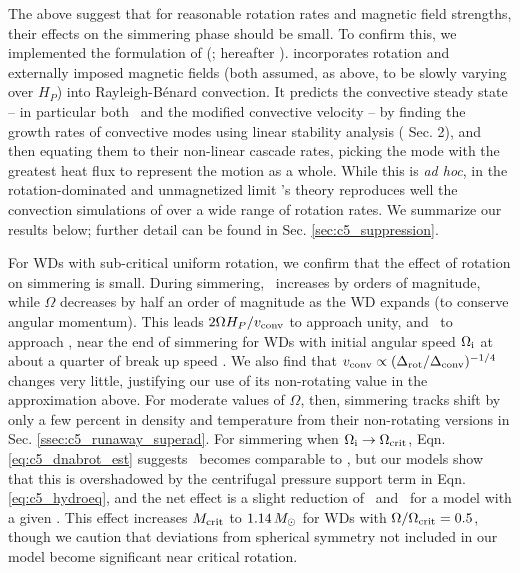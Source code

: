 The above suggest that for reasonable rotation rates and magnetic field strengths, their effects on the simmering phase should be small.  To confirm this, we implemented the formulation of \citeauthor{stev79} (\citeyear{stev79}; hereafter \citeal{stev79}).  \citeal{stev79} incorporates rotation and externally imposed magnetic fields (both assumed, as above, to be slowly varying over $H_P$) into Rayleigh-B\'{e}nard convection.  It predicts the convective steady state -- in particular both \deltanab\ and the modified convective velocity -- by finding the growth rates of convective modes using linear stability analysis (\citeal{stev79} Sec. 2), and then equating them to their non-linear cascade rates, picking the mode with the greatest heat flux to represent the motion as a whole.  While this is \textit{ad hoc}, in the rotation-dominated and unmagnetized limit \citeal{stev79}'s theory reproduces well the convection simulations of \cite{barkdl14} over a wide range of rotation rates.  We summarize our results below; further detail can be found in Sec. \ref{sec:c5_suppression}.

For WDs with sub-critical uniform rotation, we confirm that the effect of rotation on simmering is small.  During simmering, \vconv\ increases by orders of magnitude, while $\Omega$ decreases by half an order of magnitude as the WD expands (to conserve angular momentum).  This leads $2\Omega H_P/\vconv$ to approach unity, and \dnabrot\ to approach \dnabconv, near the end of simmering for WDs with initial angular speed $\Ominit$ at about a quarter of break up speed \Omcrit.  We also find that $\vconv \propto (\dnabrot/\dnabconv)^{-1/4}$ changes very little, justifying our use of its non-rotating value in the approximation above. For moderate values of $\Omega$, then, simmering tracks shift by only a few percent in density and temperature from their non-rotating versions in Sec. \ref{ssec:c5_runaway_superad}.  For simmering when $\Ominit \rightarrow \Omcrit$, Eqn. \ref{eq:c5_dnabrot_est} suggests \dnabrot\ becomes comparable to \nablaad, but our models show that this is overshadowed by the centrifugal pressure support term in Eqn. \ref{eq:c5_hydroeq}, and the net effect is a slight reduction of \rhoc\ and \Tc\ for a model with a given \Sc.  This effect increases $\Mcrit$ to $1.14\,\Msun$ for WDs with $\Omega/\Omcrit = 0.5$, though we caution that deviations from spherical symmetry not included in our model become significant near critical rotation.


